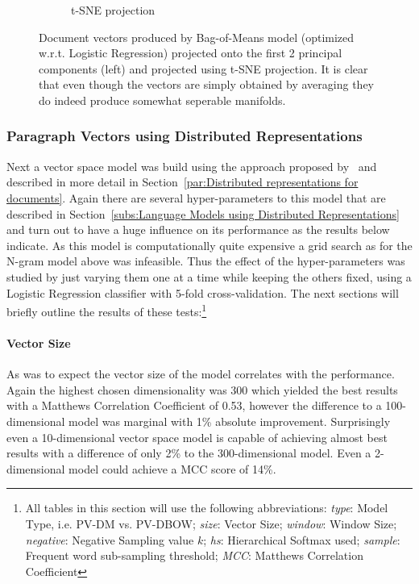\begin{figure}[h]
\begin{subfigure}[b]{0.48\textwidth}
      \caption{t-SNE projection}
\label{fig:exp-vector-space-bom-tsne}
    \end{subfigure}
    \caption{Document vectors produced by Bag-of-Means model (optimized w.r.t. Logistic Regression) projected onto the first 2 principal components (left) and projected using t-SNE projection. It is clear that even though the vectors are simply obtained by averaging they do indeed produce somewhat seperable manifolds.}
\label{fig:exp-vector-space-bom}
\end{figure}

\subsubsection{Paragraph Vectors using Distributed Representations}

Next a vector space model was build using the approach proposed by~\cite{Le:2014aa} and described in more detail in Section~\ref{par:Distributed representations for documents}. Again there are several hyper-parameters to this model that are described in Section~\ref{subs:Language Models using Distributed Representations} and turn out to have a huge influence on its performance as the results below indicate. As this model is computationally quite expensive a grid search as for the N-gram model above was infeasible. Thus the effect of the hyper-parameters was studied by just varying them one at a time while keeping the others fixed, using a Logistic Regression classifier with 5-fold cross-validation.
The next sections will briefly outline the results of these tests:\footnote{All tables in this section will use the following abbreviations: \emph{type}: Model Type, i.e. PV-DM vs. PV-DBOW; \emph{size}: Vector Size; \emph{window}: Window Size; \emph{negative}: Negative Sampling value $k$; \emph{hs}: Hierarchical Softmax used; \emph{sample}: Frequent word sub-sampling threshold; \emph{MCC}: Matthews Correlation Coefficient}

\paragraph{Vector Size}
As was to expect the vector size of the model correlates with the performance. Again the highest chosen dimensionality was 300 which yielded the best results with a Matthews Correlation Coefficient of 0.53, however the difference to a 100-dimensional model was marginal with 1\% absolute improvement. Surprisingly even a 10-dimensional vector space model is capable of achieving almost best results with a difference of only 2\% to the 300-dimensional model. Even a 2-dimensional model could achieve a MCC score of 14\%.

